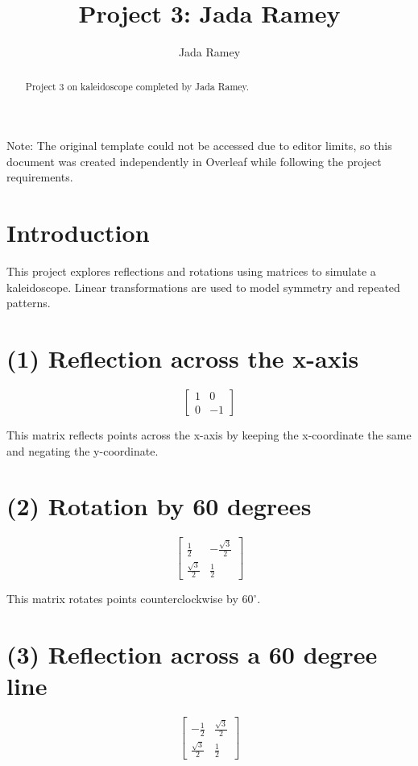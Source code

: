 \documentclass{ximera}
\title{Project 3: Jada Ramey}
\author{Jada Ramey}
\begin{document}
\begin{abstract}
    Project 3 on kaleidoscope completed by Jada Ramey.
\end{abstract}

\maketitle

Note: The original template could not be accessed due to editor limits, so this document was created independently in Overleaf while following the project requirements.

\section{Introduction}
This project explores reflections and rotations using matrices to simulate a kaleidoscope. Linear transformations are used to model symmetry and repeated patterns.

\section{(1) Reflection across the x-axis}

\[
\begin{bmatrix}
1 & 0 \\
0 & -1
\end{bmatrix}
\]

This matrix reflects points across the x-axis by keeping the x-coordinate the same and negating the y-coordinate.

\section{(2) Rotation by 60 degrees}

\[
\begin{bmatrix}
\frac{1}{2} & -\frac{\sqrt{3}}{2} \\
\frac{\sqrt{3}}{2} & \frac{1}{2}
\end{bmatrix}
\]

This matrix rotates points counterclockwise by $60^\circ$.

\section{(3) Reflection across a 60 degree line}

\[
\begin{bmatrix}
-\frac{1}{2} & \frac{\sqrt{3}}{2} \\
\frac{\sqrt{3}}{2} & \frac{1}{2}
\end{bmatrix}
\]
\end{document}
